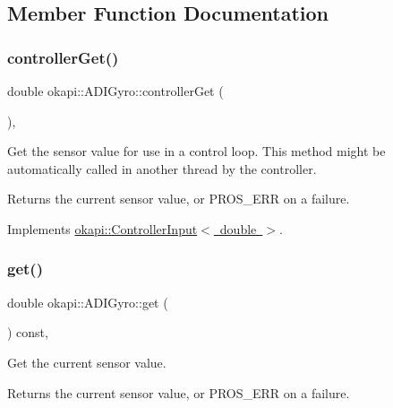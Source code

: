 \subsection{Member Function Documentation}
\mbox{\label{classokapi_1_1ADIGyro_ad6a8ed104c8383a64c984ceb1147bca4}} 
\subsubsection{\texorpdfstring{controllerGet()}{controllerGet()}}
{\footnotesize\ttfamily double okapi\+::\+A\+D\+I\+Gyro\+::controller\+Get (\begin{DoxyParamCaption}{ }\end{DoxyParamCaption})\hspace{0.3cm}{\ttfamily [override]}, {\ttfamily [virtual]}}

Get the sensor value for use in a control loop. This method might be automatically called in another thread by the controller.

\begin{DoxyReturn}{Returns}
the current sensor value, or {\ttfamily P\+R\+O\+S\+\_\+\+E\+RR} on a failure. 
\end{DoxyReturn}


Implements \mbox{\hyperlink{classokapi_1_1ControllerInput_a3c6c86d897983f367928a93890551e17}{okapi\+::\+Controller\+Input$<$ double $>$}}.

\mbox{\label{classokapi_1_1ADIGyro_a3a4a0a319c723091aad0b2125d701ca4}} 
\subsubsection{\texorpdfstring{get()}{get()}}
{\footnotesize\ttfamily double okapi\+::\+A\+D\+I\+Gyro\+::get (\begin{DoxyParamCaption}{ }\end{DoxyParamCaption}) const\hspace{0.3cm}{\ttfamily [override]}, {\ttfamily [virtual]}}

Get the current sensor value.

\begin{DoxyReturn}{Returns}
the current sensor value, or {\ttfamily P\+R\+O\+S\+\_\+\+E\+RR} on a failure. 
\end{DoxyReturn}


